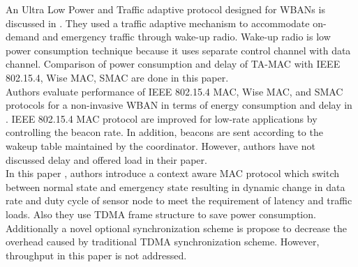 \documentclass[11pt, conference, compsocconf, onecolumn]{IEEEtran}
\begin{document}
\indent An Ultra Low Power and Traffic adaptive protocol designed for WBANs is discussed in \cite{4}. They used a traffic adaptive mechanism to accommodate on-demand and emergency traffic through wake-up radio. Wake-up radio is low power consumption technique because it uses separate control channel with data channel. Comparison of power consumption and delay of TA-MAC with IEEE 802.15.4, Wise MAC, SMAC are done in this paper.\\

\indent Authors evaluate performance of IEEE 802.15.4 MAC, Wise MAC, and SMAC protocols for a non-invasive WBAN in terms of energy consumption and delay in \cite{10}. IEEE 802.15.4 MAC protocol are improved for low-rate applications by controlling the beacon rate. In addition, beacons are sent according to the wakeup table maintained by the coordinator. However, authors have not discussed delay and offered load in their paper.\\

\indent In this paper \cite{6}, authors introduce a context aware MAC protocol which switch between normal state and emergency state resulting in dynamic change in data rate and duty cycle of sensor node to meet the requirement of latency and traffic loads. Also they use TDMA frame structure to save power consumption. Additionally a novel optional synchronization scheme is propose to decrease the overhead caused by traditional TDMA synchronization scheme. However, throughput in this paper is not addressed.\\
\end{document}
